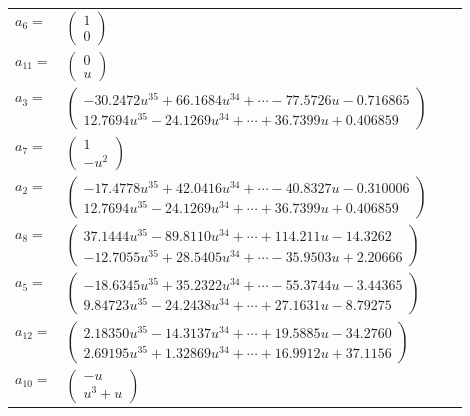 \documentclass[1p]{elsarticle_modified}
\theoremstyle{definition}
\begin{document}
\begin{tabular}{m{7pt} m{180pt} m{7pt} m{180pt} }
\flushright $a_{6}=$&$\begin{pmatrix}1\\0\end{pmatrix}$ \\
\flushright $a_{11}=$&$\begin{pmatrix}0\\u\end{pmatrix}$ \\
\flushright $a_{3}=$&$\begin{pmatrix}-30.2472 u^{35}+66.1684 u^{34}+\cdots-77.5726 u-0.716865\\12.7694 u^{35}-24.1269 u^{34}+\cdots+36.7399 u+0.406859\end{pmatrix}$ \\
\flushright $a_{7}=$&$\begin{pmatrix}1\\- u^2\end{pmatrix}$ \\
\flushright $a_{2}=$&$\begin{pmatrix}-17.4778 u^{35}+42.0416 u^{34}+\cdots-40.8327 u-0.310006\\12.7694 u^{35}-24.1269 u^{34}+\cdots+36.7399 u+0.406859\end{pmatrix}$ \\
\flushright $a_{8}=$&$\begin{pmatrix}37.1444 u^{35}-89.8110 u^{34}+\cdots+114.211 u-14.3262\\-12.7055 u^{35}+28.5405 u^{34}+\cdots-35.9503 u+2.20666\end{pmatrix}$ \\
\flushright $a_{5}=$&$\begin{pmatrix}-18.6345 u^{35}+35.2322 u^{34}+\cdots-55.3744 u-3.44365\\9.84723 u^{35}-24.2438 u^{34}+\cdots+27.1631 u-8.79275\end{pmatrix}$ \\
\flushright $a_{12}=$&$\begin{pmatrix}2.18350 u^{35}-14.3137 u^{34}+\cdots+19.5885 u-34.2760\\2.69195 u^{35}+1.32869 u^{34}+\cdots+16.9912 u+37.1156\end{pmatrix}$ \\
\flushright $a_{10}=$&$\begin{pmatrix}- u\\u^3+u\end{pmatrix}$ \\

\end{tabular}
\end{document}
